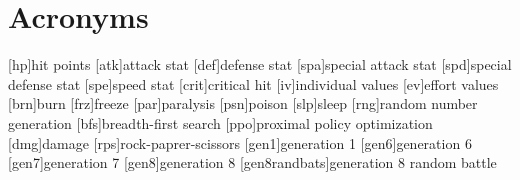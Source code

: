
\chapter*{Acronyms}

\begin{acronym}
	[hp]{hit points}
	[atk]{attack stat}
	[def]{defense stat}
	[spa]{special attack stat}
	[spd]{special defense stat}
	[spe]{speed stat}
	[crit]{critical hit}
	[iv]{individual values}
	[ev]{effort values}
	[brn]{burn}
	[frz]{freeze}
	[par]{paralysis}
	[psn]{poison}
	[slp]{sleep}
	[rng]{random number generation}
	[bfs]{breadth-first search}
	[ppo]{proximal policy optimization}
	[dmg]{damage}
	[rps]{rock-paprer-scissors}
	[gen1]{generation 1}
	[gen6]{generation 6}
	[gen7]{generation 7}
	[gen8]{generation 8}
	[gen8randbats]{generation 8 random battle}
\end{acronym}